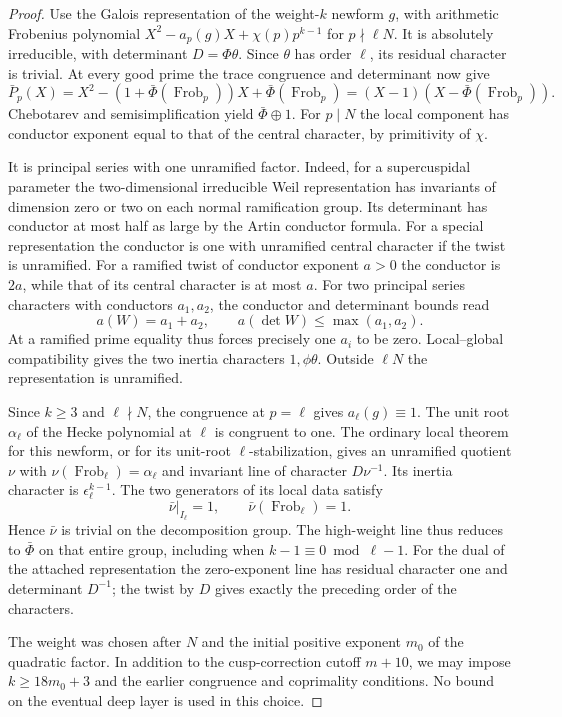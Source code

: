 \begin{proof}
Use the Galois representation of the weight-\(k\) newform
\(g\), with arithmetic Frobenius polynomial
\(X^2-a_p(g)X+\chi(p)p^{k-1}\) for \(p\nmid\ell N\).
It is absolutely irreducible, with determinant
\(D=\Phi\theta\). Since \(\theta\) has order \(\ell\), its residual character is trivial. At every good prime the trace congruence and determinant now give
\[
 \bar P_p(X)=X^2-(1+\bar\Phi(\operatorname{Frob}_p))X+
 \bar\Phi(\operatorname{Frob}_p)
 =(X-1)(X-\bar\Phi(\operatorname{Frob}_p)).
\]
Chebotarev and semisimplification yield \(\bar\Phi\oplus1\). For \(p\mid N\) the local component has conductor
exponent equal to that of the central character, by primitivity
of \(\chi\).

It is principal series with one unramified factor.
Indeed, for a supercuspidal parameter the two-dimensional
irreducible Weil representation has invariants of dimension
zero or two on each normal ramification group. Its determinant
has conductor at most half as large by the Artin conductor
formula. For a special representation the conductor is one
with unramified central character if the twist is unramified.
For a ramified twist of conductor exponent \(a>0\) the
conductor is \(2a\), while that of its central character is
at most \(a\). For two principal series characters with conductors
\(a_1,a_2\), the conductor and determinant bounds read
\[
                a(W)=a_1+a_2,\qquad a(\det W)\le\max(a_1,a_2).
\]
At a ramified prime equality thus forces precisely one
\(a_i\) to be zero. Local--global
compatibility gives the two inertia characters \(1,\phi\theta\).
Outside \(\ell N\) the representation is unramified.
\cite{deligne-galois,carayol-local}

Since \(k\geq3\) and \(\ell\nmid N\), the congruence at
\(p=\ell\) gives \(a_\ell(g)\equiv1\). The unit root
\(\alpha_\ell\) of the Hecke polynomial at \(\ell\) is
congruent to one. The ordinary local theorem for this
newform, or for its unit-root \(\ell\)-stabilization, gives
an unramified quotient \(\nu\) with
\(\nu(\operatorname{Frob}_\ell)=\alpha_\ell\) and invariant
line of character \(D\nu^{-1}\). Its inertia character is
\(\epsilon_\ell^{k-1}\). The two generators of its local data satisfy
\[
         \bar\nu|_{I_\ell}=1,\qquad
         \bar\nu(\operatorname{Frob}_\ell)=1 .
\]
Hence \(\bar\nu\) is trivial on the decomposition group. The high-weight line thus reduces to \(\bar\Phi\)
on that entire group, including when
\(k-1\equiv0\bmod\ell-1\).
For the dual of the attached representation the
zero-exponent line has residual character one and determinant
\(D^{-1}\); the twist by \(D\) gives exactly the preceding
order of the characters. \cite{hida-ordinary-galois}\label{cor:ordinary-count-iii-eigenform-2}

The weight was chosen after \(N\) and the initial positive
exponent \(m_0\) of the quadratic factor. In addition to
the cusp-correction cutoff \(m+10\), we may impose
\(k\geq18m_0+3\) and the earlier congruence and coprimality
conditions. No bound on the eventual deep layer is used in
this choice.
\end{proof}
